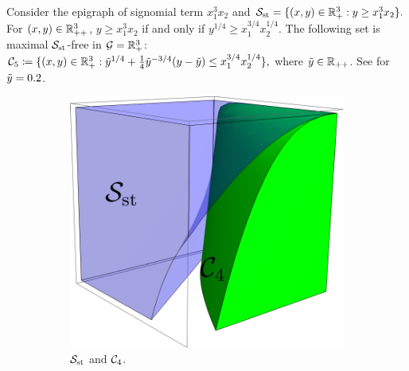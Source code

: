 \begin{example}
Consider the epigraph of signomial term $x_1^3 x_2$ and
$
	\mathcal S_{\mathrm{st}} = \{(x,y) \in \mathbb R_{+}^3: y \ge x_1^3 x_2\}.
$ For $(x,y) \in \mathbb R_{++}^3$, $  y \ge x_1^3 x_2 $ if and only if $ y^{1/4} \ge x_1^{3/4}x_2^{1/4} $. The following set is maximal $\mathcal S_{\mathrm{st}}$-free in $\mathcal G = \mathbb R_+^3$:
$
	\mathcal C_5\coloneqq \{(x,y) \in \mathbb R_{+}^3:  \tilde{y}^{1/4} + \frac{1}{4} \tilde{y}^{-3/4}(y - \tilde{y})\le x_1^{3/4}x_2^{1/4}  \},
$
where $\tilde{y} \in \mathbb R_{++}$. See  for $\tilde{y} = 0.2$.
\end{example}
\begin{figure}[!ht]
 \centering
  \begin{subfigure}[b]{0.35\textwidth}
     	\centering
     	\includegraphics[width=\textwidth]{Chaptersig/media/sfree1.pdf}
     	\caption{$\mathcal S_{\mathrm{st}}$ and $\mathcal C_4$.}
    	\label{fig.free1}
 \end{subfigure}
 \hfill
  \begin{subfigure}[b]{0.35\textwidth}
     	\centering

\end{subfigure}
\end{figure}
